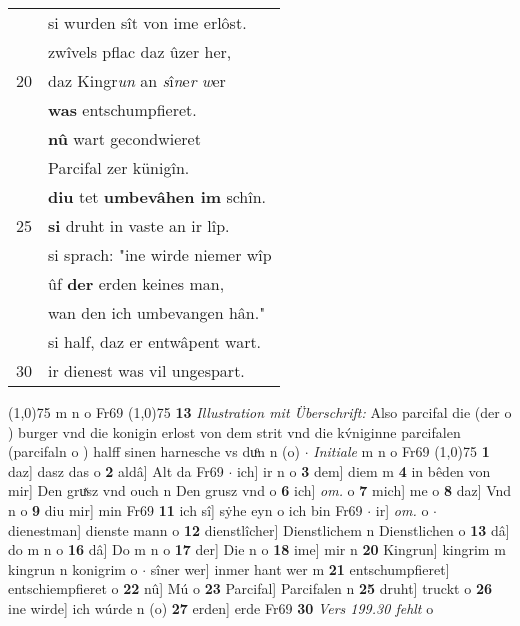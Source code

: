 \documentclass[8pt,a4paper,notitlepage]{article}
\begin{document}
\begin{table}[ht]
\begin{minipage}[t]{0.5\linewidth}
\begin{tabular}{rl}
 & si wurden sît von ime erlôst.\\ 
 & zwîvels pflac daz ûzer her,\\ 
20 & daz Kingr\textit{un} an \textit{s}î\textit{n}e\textit{r} \textit{w}er\\ 
 & \textbf{was} entschumpfieret.\\ 
 & \textbf{nû} wart gecondwieret\\ 
 & Parcifal zer künigîn.\\ 
 & \textbf{diu} tet \textbf{umbevâhen im} schîn.\\ 
25 & \textbf{si} druht in vaste an ir lîp.\\ 
 & si sprach: "ine wirde niemer wîp\\ 
 & ûf \textbf{der} erden keines man,\\ 
 & wan den ich umbevangen hân."\\ 
 & si half, daz er entwâpent wart.\\ 
30 & ir dienest was vil ungespart.\\ 
\end{tabular}
\scriptsize
\line(1,0){75} \newline
m n o Fr69 \newline
\line(1,0){75} \newline
\textbf{13} \textit{Illustration mit Überschrift:} Also parcifal die (der o  ) burger vnd die konigin erlost von dem strit vnd die kv́niginne parcifalen (parcifaln o  ) halff sinen harnesche vs duͦn n (o)   $\cdot$ \textit{Initiale} m n o Fr69  \newline
\line(1,0){75} \newline
\textbf{1} daz] dasz das o \textbf{2} aldâ] Alt da Fr69  $\cdot$ ich] ir n o \textbf{3} dem] diem m \textbf{4} in bêden von mir] Den gruͯsz vnd ouch n Den grusz vnd o \textbf{6} ich] \textit{om.} o \textbf{7} mich] me o \textbf{8} daz] Vnd n o \textbf{9} diu mir] min Fr69 \textbf{11} ich sî] sẏhe eyn o ich bin Fr69  $\cdot$ ir] \textit{om.} o  $\cdot$ dienestman] dienste mann o \textbf{12} dienstlîcher] Dienstlichem n Dienstlichen o \textbf{13} dâ] do m n o \textbf{16} dâ] Do m n o \textbf{17} der] Die n o \textbf{18} ime] mir n \textbf{20} Kingrun] kingrim m kingrun n konigrim o  $\cdot$ sîner wer] inmer hant wer m \textbf{21} entschumpfieret] entschiempfieret o \textbf{22} nû] Mú o \textbf{23} Parcifal] Parcifalen n \textbf{25} druht] truckt o \textbf{26} ine wirde] ich wúrde n (o) \textbf{27} erden] erde Fr69 \textbf{30} \textit{Vers 199.30 fehlt} o  \newline
\end{minipage}
\end{table}
\end{document}

